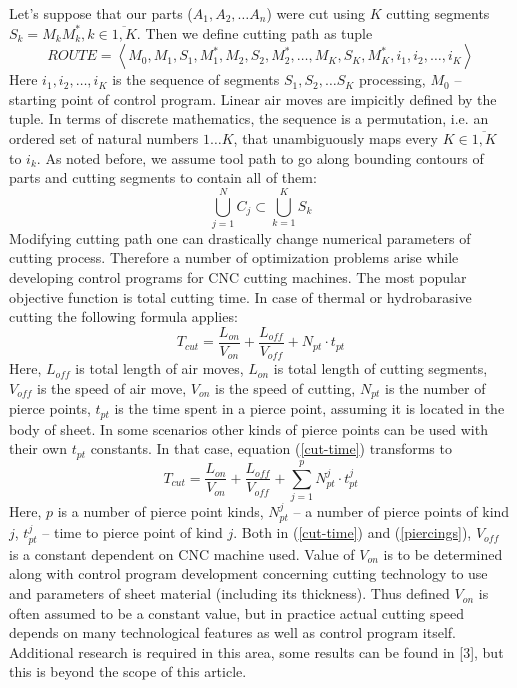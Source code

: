 \documentclass{../download/tPRS2e}
\begin{document}
Let's suppose that our parts
($A_1, A_2, \dots A_n$) were cut
using $K$ cutting segments
$S_k = M_kM_k^*, k \in \overline{1, K}$.
Then we define cutting path as tuple
\begin{equation}
    ROUTE = 
    \left< M_0, M_1, S_1, M_1^*, M_2, S_2, M_2^*, \dots, M_K, S_K, M_K^*, i_1, i_2, \dots, i_K\right>
    \label{tuple}
\end{equation}
Here $i_1, i_2, \dots, i_K$ is the sequence of segments
$S_1, S_2, \dots S_K$ processing,
$M_0$ -- starting point of control program.
Linear air moves are impicitly defined by the tuple.
In terms of discrete mathematics,
the sequence is a permutation,
i.e. an ordered set of natural numbers $1\dots K$,
that unambiguously maps every
$K \in \overline{1, K}$ to $i_k$.
As noted before,
we assume tool path to go along
bounding contours of parts
and cutting segments to contain all of them:
$$
\bigcup_{j=1}^N C_j \subset \bigcup_{k=1}^K S_k
$$
Modifying cutting path one can
drastically change numerical parameters
of cutting process.
Therefore a number of optimization problems
arise while developing
control programs for CNC cutting machines.
The most popular objective function
is total cutting time.
In case of thermal or 
hydrobarasive cutting the following formula applies:
\begin{equation}
    T_{cut} = \frac{L_{on}}{V_{on}} + \frac{L_{off}}{V_{off}} + N_{pt} \cdot t_{pt}
    \label{cut-time}
\end{equation}
Here,
$L_{off}$ is total length of air moves,
$L_{on}$ is total length of cutting segments,
$V_{off}$ is the speed of air move,
$V_{on}$ is the speed of cutting,
$N_{pt}$ is the number of pierce points,
$t_{pt}$ is the time spent in a pierce point,
assuming it is located in the body of sheet.
In some scenarios other kinds of pierce points
can be used
with their own $t_{pt}$ constants.
In that case, equation (\ref{cut-time})
transforms to
\begin{equation}
    T_{cut} = \frac{L_{on}}{V_{on}} + \frac{L_{off}}{V_{off}}
    + \sum_{j=1}^p N_{pt}^j \cdot t_{pt}^j
    \label{piercings}
\end{equation}
Here,
$p$ is a number of pierce point kinds,
$N_{pt}^j$ -- a number of pierce points of kind $j$,
$t_{pt}^j$ -- time to pierce point of kind $j$.
Both in (\ref{cut-time}) and (\ref{piercings}),
$V_{off}$ is a constant dependent on CNC machine used.
Value of $V_{on}$ is to be determined along with
control program development
concerning cutting technology to use
and parameters of sheet material
(including its thickness).
Thus defined $V_{on}$
is often assumed to be a constant value,
but in practice
actual cutting speed depends on
many technological features as well as 
control program itself.
Additional research is required in this area,
some results can be found in [3],
but this is beyond the scope of this article.
\end{document}
